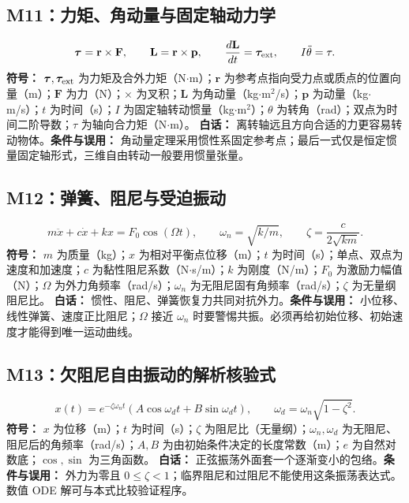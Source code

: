 \subsection{M11：力矩、角动量与固定轴动力学}
\begin{equation}
\boldsymbol\tau=\mathbf r\times\mathbf F,\qquad \mathbf L=\mathbf r\times\mathbf p,\qquad \frac{d\mathbf L}{dt}=\boldsymbol\tau_{\rm ext},\qquad I\ddot\theta=\tau.
\end{equation}
\textbf{符号：} $\boldsymbol\tau,\boldsymbol\tau_{\rm ext}$ 为力矩及合外力矩（N$\cdot$m）；$\mathbf r$ 为参考点指向受力点或质点的位置向量（m）；$\mathbf F$ 为力（N）；$\times$ 为叉积；$\mathbf L$ 为角动量（kg$\cdot$m$^2$/s）；$\mathbf p$ 为动量（kg$\cdot$m/s）；$t$ 为时间（s）；$I$ 为固定轴转动惯量（kg$\cdot$m$^2$）；$\theta$ 为转角（rad）；双点为时间二阶导数；$\tau$ 为轴向合力矩（N$\cdot$m）。
\textbf{白话：} 离转轴远且方向合适的力更容易转动物体。\textbf{条件与误用：} 角动量定理采用惯性系固定参考点；最后一式仅是恒定惯量固定轴形式，三维自由转动一般要用惯量张量。

\subsection{M12：弹簧、阻尼与受迫振动}
\begin{equation}
m\ddot x+c\dot x+kx=F_0\cos(\Omega t),\qquad \omega_n=\sqrt{k/m},\qquad \zeta=\frac{c}{2\sqrt{km}}.
\end{equation}
\textbf{符号：} $m$ 为质量（kg）；$x$ 为相对平衡点位移（m）；$t$ 为时间（s）；单点、双点为速度和加速度；$c$ 为黏性阻尼系数（N$\cdot$s/m）；$k$ 为刚度（N/m）；$F_0$ 为激励力幅值（N）；$\Omega$ 为外力角频率（rad/s）；$\omega_n$ 为无阻尼固有角频率（rad/s）；$\zeta$ 为无量纲阻尼比。
\textbf{白话：} 惯性、阻尼、弹簧恢复力共同对抗外力。\textbf{条件与误用：} 小位移、线性弹簧、速度正比阻尼；$\Omega$ 接近 $\omega_n$ 时要警惕共振。必须再给初始位移、初始速度才能得到唯一运动曲线。

\subsection{M13：欠阻尼自由振动的解析核验式}
\begin{equation}
x(t)=e^{-\zeta\omega_nt}\left(A\cos\omega_dt+B\sin\omega_dt\right),\qquad \omega_d=\omega_n\sqrt{1-\zeta^2}.
\end{equation}
\textbf{符号：} $x$ 为位移（m）；$t$ 为时间（s）；$\zeta$ 为阻尼比（无量纲）；$\omega_n,\omega_d$ 为无阻尼、阻尼后的角频率（rad/s）；$A,B$ 为由初始条件决定的长度常数（m）；$e$ 为自然对数底；$\cos,\sin$ 为三角函数。
\textbf{白话：} 正弦振荡外面套一个逐渐变小的包络。\textbf{条件与误用：} 外力为零且 $0\leq\zeta<1$；临界阻尼和过阻尼不能使用这条振荡表达式。数值 ODE 解可与本式比较验证程序。

